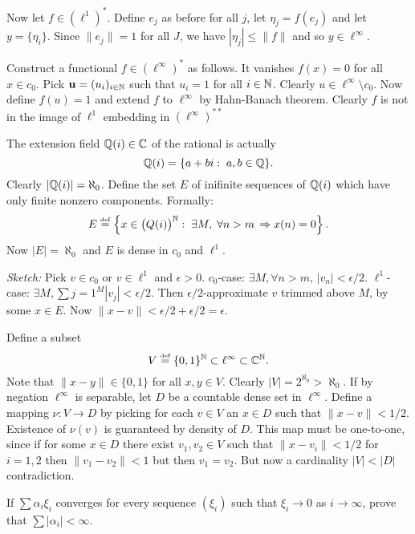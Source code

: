 \begin{enumerate}
\begin{itemize}
 Now let \(f\in (\ell^1)^*\). Define \(e_j\) as before for all $j$, 
 let \(\eta_j= f(e_j)\) and let \(y=\{\eta_i\}\).
 Since \(\|e_j\|=1\) for all $J$, we have \(|\eta_j| \leq \|f\|\)
 and so \(y\in \ell^\infty\).

 Construct a functional \(f\in (\ell^\infty)^*\) as follows.
 It vanishes \(f(x)=0\) for all \(x\in c_0\). 
 Pick \(\mathbf{u}=(u_i)_{i\in\mathbb{N}}\)
 such that \(u_i=1\) for all \(i\in\mathbb{N}\). 
 Clearly \(u\in \ell^\infty\setminus c_0\).
 Now define \(f(u)=1\) and extend $f$ to \(\ell^\infty\) by Hahn-Banach theorem.
 Clearly $f$ is not in the image of \(\ell^1\) embedding in 
 \((\ell^\infty)^{**}\) 
 
 The extension field \(\mathbb{Q}(i)\in \mathbb{C}\) of the rational is actually
 \[\mathbb{Q}(i) = \{a+bi:\;a,b\in\mathbb{Q}\}.\]
 Clearly \(|\mathbb{Q}(i)|=\aleph_0\).
 Define the set $E$ of inifinite sequences of \(\mathbb{Q}(i)\) which 
 have only finite nonzero components. Formally:
 \[ E \stackrel{\mbox{\upshape\tiny def}}{=} \left\{x\in \bigl(Q(i)\bigr)^{\mathbb{N}}:\; 
                     \exists M,\; \forall n>m\,\Rightarrow x(n)=0\right\}.\]
 Now \(|E|=\aleph_0\) and $E$ is dense in \(c_0\) and \(\ell^1\).
 
 {\small
 \emph{Sketch:} Pick \(v\in c_0\) or \(v \in \ell^1\) and \(\epsilon>0\).
 \(c_0\)-case: \(\exists M, \forall n>m,\, |v_n|<\epsilon/2\). 
 \(\ell^1\)-case: \(\exists M, \sum{j=1}^M |v_j| <\epsilon/2\). 
 Then \(\epsilon/2\)-approximate $v$ trimmed above $M$, by some \(x\in E\).
 Now \(\|x-v\|<\epsilon/2+\epsilon/2=\epsilon\).
 }

 Define a subset
 \[V \stackrel{\mbox{\upshape\tiny def}}{=}  \{0,1\}^{\mathbb{N}} \subset \ell^\infty \subset \mathbb{C}^{\mathbb{N}}.\]
 Note that \(\|x-y\|\in\{0,1\}\) for all \(x,y\in V\).
 Clearly \(|V| = 2^{\aleph_0} > \aleph_0\).
 If by negation \(\ell^\infty\) is separable, let $D$ be a countable dense
 set in  \(\ell^\infty\). 
 Define a mapping \(\nu:V\to D\) by picking 
 for each \(v\in V\) an \(x\in D\) such that \(\|x-v\|<1/2\).
 Existence of \(\nu(v)\) is guaranteed by density of $D$.
 This map must be one-to-one, since if for some \(x\in D\)
 there exist \(v_1,v_2\in V\) such that \(\|x-v_i\|<1/2\) for \(i=1,2\)
 then \(\|v_1-v_2\|<1\) but then \(v_1=v_2\).
 But now a cardinality \(|V|<|D|\) contradiction.
\end{itemize}

\begin{excopy}
If \(\sum \alpha_i\xi_i\) converges for every sequence \((\xi_i)\) such that
\(\xi_i \to 0\) as \(i\to\infty\), prove that \(\sum|\alpha_i| < \infty\).
\end{excopy}


\end{enumerate}
